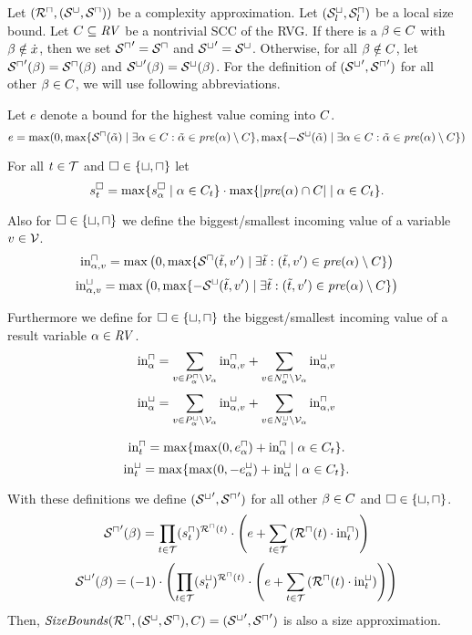 \begin{theorem}
  Let $({\mathcal{R}^\sqcap}, {({\mathcal{S}^\sqcup}, {\mathcal{S}^\sqcap})})$ be a complexity approximation.
  Let ${({\mathcal{S}^\sqcup_l}, {\mathcal{S}^\sqcap_l})}$ be a local size bound.
  Let $C \subseteq \mathit{RV}$ be a nontrivial SCC of the RVG.
  If there is a $\beta \in C$ with $\beta \notin \dot{x}$, then we set ${\mathcal{S}^\sqcap}' = {\mathcal{S}^\sqcap}$ and ${\mathcal{S}^\sqcup}' = {\mathcal{S}^\sqcup}$.
  Otherwise, for all $\beta \notin C$, let ${\mathcal{S}^\sqcap}'(\beta) = {\mathcal{S}^\sqcap}(\beta)$ and ${\mathcal{S}^\sqcup}'(\beta) = {\mathcal{S}^\sqcup}(\beta)$.
  For the definition of $({\mathcal{S}^\sqcup}', {\mathcal{S}^\sqcap}')$ for all other $\beta \in C$, we will use following abbreviations.

  Let $e$ denote a bound for the highest value coming into $C$.
  \[ e = \max ( 0,
    \max \lbrace {\mathcal{S}^\sqcap}(\tilde{\alpha}) \mid \exists \alpha \in C: \tilde{\alpha} \in \mathit{pre}(\alpha) \setminus C \rbrace,
    \max \lbrace -{\mathcal{S}^\sqcup}(\tilde{\alpha}) \mid \exists \alpha \in C: \tilde{\alpha} \in \mathit{pre}(\alpha) \setminus C \rbrace)
  \]

  For all $t \in \mathcal{T}$ and $\square \in \lbrace \sqcup, \sqcap \rbrace$ let
  \[ s^\square_t = \max \lbrace s^\square_{\alpha} \mid \alpha \in C_t \rbrace \cdot \max \lbrace \left|\mathit{pre}(\alpha) \cap C\right| \mid \alpha \in C_t \rbrace. \]

  Also for $\square \in \lbrace \sqcup, \sqcap \rbrace$ we define the biggest/smallest incoming value of a variable $v \in \mathcal{V}$.
  \[ \text{in}^\sqcap_{\alpha,v} = \max \left( 0, \max \lbrace \mathcal{S}^\sqcap(\tilde{t}, v') \mid \exists \tilde{t}: (\tilde{t}, v') \in \mathit{pre}(\alpha) \setminus C \rbrace \right) \]
  \[ \text{in}^\sqcup_{\alpha,v} = \max \left( 0, \max \lbrace -\mathcal{S}^\sqcup(\tilde{t}, v') \mid \exists \tilde{t}: (\tilde{t}, v') \in \mathit{pre}(\alpha) \setminus C \rbrace \right) \]

  Furthermore we define for $\square \in \lbrace \sqcup, \sqcap \rbrace$ the biggest/smallest incoming value of a result variable $\alpha \in \mathit{RV}$.
  \[ \text{in}^\sqcap_\alpha = \sum_{v \in P_\alpha^\sqcap \setminus \mathcal{V}_\alpha} \text{in}^\sqcap_{\alpha,v} + \sum_{v \in N_\alpha^\sqcap \setminus \mathcal{V}_\alpha} \text{in}^\sqcup_{\alpha,v} \]
  \[ \text{in}^\sqcup_\alpha = \sum_{v \in P_\alpha^\sqcup \setminus \mathcal{V}_\alpha} \text{in}^\sqcup_{\alpha,v} + \sum_{v \in N_\alpha^\sqcup \setminus \mathcal{V}_\alpha} \text{in}^\sqcap_{\alpha,v} \]
  
  \[ \text{in}^\sqcap_t = \max \lbrace \max(0, e^{\sqcap}_\alpha) + \text{in}^\sqcap_\alpha \mid \alpha \in C_t  \rbrace. \]
  \[ \text{in}^\sqcup_t = \max \lbrace \max(0, -e^{\sqcup}_\alpha) + \text{in}^\sqcup_\alpha \mid \alpha \in C_t  \rbrace. \]

  With these definitions we define $({\mathcal{S}^\sqcup}', {\mathcal{S}^\sqcap}')$ for all other $\beta \in C$ and $\square \in \lbrace \sqcup, \sqcap \rbrace$.
  \[ {\mathcal{S}^\sqcap}'(\beta) =
  \prod_{t \in \mathcal{T}} (s^\sqcap_t)^{{\mathcal{R}^\sqcap}(t)} \cdot \left( e + 
  \sum_{t \in \mathcal{T}} \left( {\mathcal{R}^\sqcap}(t) \cdot \text{in}^\sqcap_t \right) \right)
  \]
  \[ {\mathcal{S}^\sqcup}'(\beta) = (-1) \cdot \left(
  \prod_{t \in \mathcal{T}} (s^\sqcup_t)^{{\mathcal{R}^\sqcap}(t)} \cdot \left( e + 
  \sum_{t \in \mathcal{T}} \left( {\mathcal{R}^\sqcap}(t) \cdot \text{in}^\sqcup_t \right) \right)
  \right)
  \]
  Then, $\mathit{SizeBounds}({\mathcal{R}^\sqcap}, {({\mathcal{S}^\sqcup}, {\mathcal{S}^\sqcap})}, C) = ({\mathcal{S}^\sqcup}', {\mathcal{S}^\sqcap}')$ is also a size approximation. 
\end{theorem}
